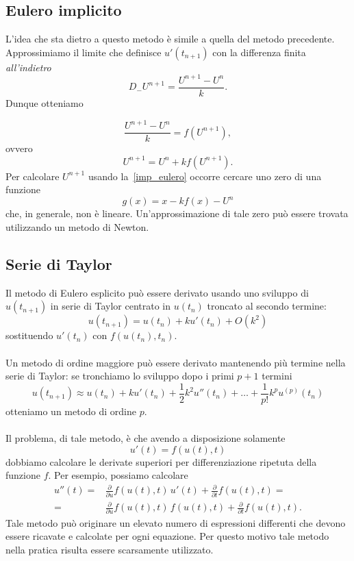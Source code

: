 \subsection{Eulero implicito }
L'idea che sta dietro a questo metodo \`e simile a quella del metodo precedente.\\
Approssimiamo il limite che definisce $u'\left(t_{n+1}\right)$ con la differenza finita \emph{all'indietro}
$$ D_{-}U^{n+1} = \frac{ U^{n+1}-U^n}{k}.$$ 
Dunque otteniamo 

$$ \frac{ U^{n+1}-U^n}{k} = f\left(U^{n+1}\right),$$ 
ovvero 
\begin{equation}
	 U^{n+1} = U^n + k f\left(U^{n+1}\right).
	 \label{imp_eulero}
\end{equation}
Per calcolare $U^{n+1}$ usando la~\eqref{imp_eulero} occorre cercare uno zero di una funzione 
$$ g(x) = x - kf(x) - U^n$$ 
che, in generale, non \`e lineare. Un'approssimazione di tale  zero pu\`o essere trovata utilizzando un metodo di Newton.
\subsection{Serie di Taylor}
Il metodo di Eulero esplicito pu\`o essere derivato usando uno sviluppo di $u\left(t_{n+1}\right)$ in serie di Taylor  centrato in $u\left(t_n\right)$ troncato al secondo termine:
$$ u\left(t_{n+1}\right) = u(t_n) + k u'\left(t_n\right) + O\left(k^2\right)$$ 
sostituendo $u'\left(t_n\right)$ con $f\left(u\left(t_n\right),t_n\right)$.\\ \\
Un metodo di ordine maggiore pu\`o essere derivato mantenendo pi\`u termine nella serie di Taylor: se tronchiamo lo sviluppo dopo i primi $p+1$ termini
$$ u\left(t_{n+1}\right) \approx u\left(t_{n}\right) + ku'\left(t_{n}\right) + \frac{1}{2} k^2 u''\left(t_{n}\right) + \dots + \frac{1}{p!}k^p u^{(p)}\left(t_{n}\right)$$ 
otteniamo un metodo di ordine $p$.\\ \\

Il problema, di tale metodo, \`e che avendo a disposizione solamente
$$ u'(t) = f(u(t),t)$$
 dobbiamo calcolare le derivate superiori per differenziazione ripetuta della funzione $f$. Per esempio, possiamo calcolare 
\begin{equation*}
\label{der2}
	\begin{aligned}
	u''(t) =&\frac{\partial}{\partial u} f\left(u(t),t\right) \, u'(t) + 	\frac{\partial}{\partial t} f\left(u(t),t\right) =\\
	=& \frac{\partial}{\partial u} f\left(u(t),t\right) \, f\left(u(t),t\right) + \frac{\partial}{\partial t} f\left(u(t),t\right).\end{aligned}
\end{equation*}
Tale metodo pu\`o originare un elevato numero di espressioni differenti che devono essere ricavate e calcolate per ogni equazione. Per questo motivo tale metodo nella pratica risulta essere scarsamente utilizzato.
